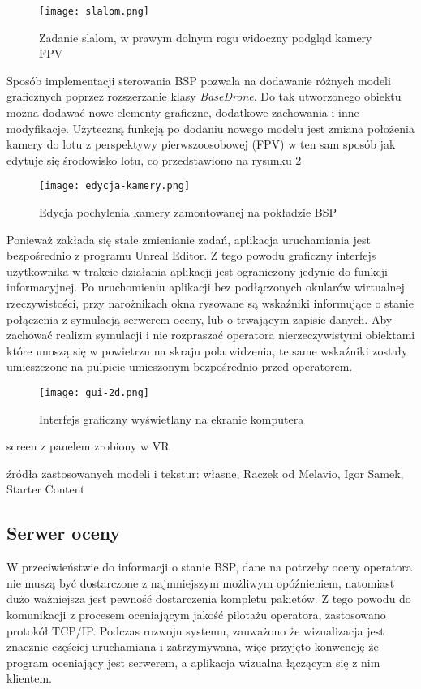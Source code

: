 \begin{figure}[!h]
    \caption{Zadanie slalom, w prawym dolnym rogu widoczny podgląd kamery FPV}
    \label{fig:slalom}
    \centering \texttt{[image: slalom.png]}
\end{figure}

Sposób implementacji sterowania BSP pozwala na dodawanie różnych modeli graficznych poprzez rozszerzanie klasy \emph{BaseDrone}. Do tak utworzonego obiektu można dodawać nowe elementy graficzne, dodatkowe zachowania i inne modyfikacje. Użyteczną funkcją po dodaniu nowego modelu jest zmiana położenia kamery do lotu z perspektywy pierwszoosobowej (FPV) w ten sam sposób jak edytuje się środowisko lotu, co przedstawiono na rysunku \ref{fig:edycja-kamery}

\begin{figure}[!h]
    \caption{Edycja pochylenia kamery zamontowanej na pokładzie BSP}
    \label{fig:edycja-kamery}
    \centering \texttt{[image: edycja-kamery.png]}
\end{figure}

Ponieważ zakłada się stałe zmienianie zadań, aplikacja uruchamiania jest bezpośrednio z programu Unreal Editor. Z tego powodu graficzny interfejs uzytkownika w trakcie działania aplikacji jest ograniczony jedynie do funkcji informacyjnej. Po uruchomieniu aplikacji bez podłączonych okularów wirtualnej rzeczywistości, przy narożnikach okna rysowane są wskaźniki informujące o stanie połączenia z symulacją serwerem oceny, lub o trwającym zapisie danych. Aby zachować realizm symulacji i nie rozpraszać operatora nierzeczywistymi obiektami które unoszą się w powietrzu na skraju pola widzenia, te same wskaźniki zostały umieszczone na pulpicie umieszonym bezpośrednio przed operatorem.

\begin{figure}[!h]
    \caption{Interfejs graficzny wyświetlany na ekranie komputera}
    \label{fig:gui-2d}
    \centering \texttt{[image: gui-2d.png]}
\end{figure}

\begin{todo}
    screen z panelem zrobiony w VR
\end{todo}

\begin{todo}
    źródła zastosowanych modeli i tekstur: własne, Raczek od Melavio, Igor Samek, Starter Content
\end{todo}

\subsection{Serwer oceny}
W przeciwieństwie do informacji o stanie BSP, dane na potrzeby oceny operatora nie muszą być dostarczone z najmniejszym możliwym opóźnieniem, natomiast dużo ważniejsza jest pewność dostarczenia kompletu pakietów. Z tego powodu do komunikacji z procesem oceniającym jakość pilotażu operatora, zastosowano protokół TCP/IP. Podczas rozwoju systemu, zauważono że wizualizacja jest znacznie częściej uruchamiana i zatrzymywana, więc przyjęto konwencję że program oceniający jest serwerem, a aplikacja wizualna łączącym się z nim klientem.


